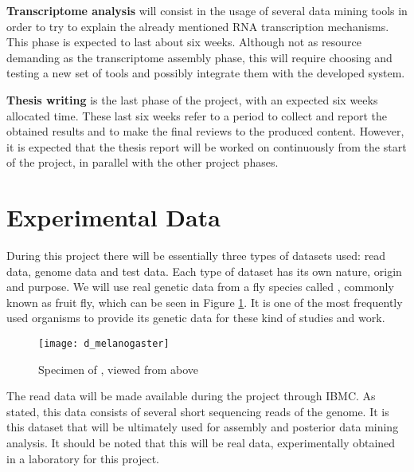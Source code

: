 \begin{description}
  \item \textbf{Transcriptome analysis}
  will consist in the usage of several data mining tools in order to try to
  explain the already mentioned RNA transcription mechanisms. This phase is
  expected to last about six weeks. Although not as resource demanding as the
  transcriptome assembly phase, this will require choosing and testing a new
  set of tools and possibly integrate them with the developed system.

  \item \textbf{Thesis writing}
  is the last phase of the project, with an expected six weeks allocated time.
  These last six weeks refer to a period to collect and report the obtained
  results and to make the final reviews to the produced content. However, it is
  expected that the thesis report will be worked on continuously from the start 
  of the project, in parallel with the other project phases.

\end{description}

\section{Experimental Data}\label{sec:datasets}

During this project there will be essentially three types of datasets used: read
data, genome data and test data. Each type of dataset has its own nature, origin
and purpose. We will use real genetic data from a fly species called \fly{},
commonly known as fruit fly, which can be seen in Figure \ref{fig:fly}. It is
one of the most frequently used organisms to provide its genetic data for these
kind of studies and work.

\begin{figure}[!htb]
  \begin{center}
    \leavevmode
    \texttt{[image: d\_melanogaster]}
    \caption[Specimen of \fly, viewed from above]{Specimen of \fly, viewed from above\protect\footnotemark}
    \label{fig:fly}
  \end{center}
\end{figure}

The read data will be made available during the project through IBMC. As stated,
this data consists of several short sequencing reads of the \fly{} genome. It is
this dataset that will be ultimately used for assembly and posterior data mining
analysis. It should be noted that this will be real data, experimentally
obtained in a laboratory for this project.

